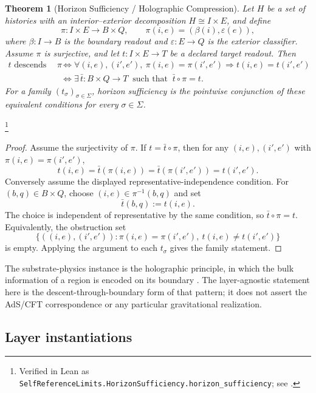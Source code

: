 \documentclass[11pt]{article}
\newtheorem{theorem}{Theorem}[section]
\theoremstyle{definition}
\begin{document}
\begin{theorem}[Horizon Sufficiency / Holographic Compression]\label{thm:F33}
Let \(H\) be a set of histories with an interior--exterior
decomposition \(H \cong I \times E\), and define
\[
  \pi : I \times E \longrightarrow B \times Q,
  \qquad
  \pi(i,e)=(\beta(i),\varepsilon(e)),
\]
where \(\beta:I\to B\) is the boundary readout and
\(\varepsilon:E\to Q\) is the exterior classifier. Assume \(\pi\) is
surjective, and let \(t:I\times E\to T\) be a declared target readout.
Then
\begin{align*}
  t \text{ descends through }\pi
  &\iff
  \forall (i,e),(i',e'),\
    \pi(i,e)=\pi(i',e')\Rightarrow t(i,e)=t(i',e')\\
  &\iff
  \exists\,\bar t:B\times Q\to T\ \text{ such that }\
    \bar t\circ\pi=t .
\end{align*}
For a family \((t_\sigma)_{\sigma\in\Sigma}\), horizon sufficiency is
the pointwise conjunction of these equivalent conditions for every
\(\sigma\in\Sigma\).
\end{theorem}
\footnote{\raggedright Verified in Lean as
\texttt{SelfReferenceLimits.\allowbreak{}HorizonSufficiency.\allowbreak{}horizon\_sufficiency};
see \Cref{app:formalization}.}
\begin{proof}
Assume the surjectivity of \(\pi\). If \(t=\bar t\circ\pi\), then for
any \((i,e),(i',e')\) with \(\pi(i,e)=\pi(i',e')\),
\[
  t(i,e)=\bar t(\pi(i,e))
        =\bar t(\pi(i',e'))
        =t(i',e').
\]
Conversely assume the displayed representative-independence condition.
For \((b,q)\in B\times Q\), choose \((i,e)\in\pi^{-1}(b,q)\) and set
\[
  \bar t(b,q):=t(i,e).
\]
The choice is independent of representative by the same condition, so
\(\bar t\circ\pi=t\). Equivalently, the obstruction set
\[
  \{((i,e),(i',e')):\pi(i,e)=\pi(i',e'),\ t(i,e)\ne t(i',e')\}
\]
is empty. Applying the argument to each \(t_\sigma\) gives the family
statement.
\end{proof}

The substrate-physics instance is the holographic principle, in which
the bulk information of a region is encoded on its boundary
\citep{Maldacena1997LargeN,Bousso2002Holographic}.  The
layer-agnostic statement here is the descent-through-boundary form
of that pattern; it does not assert the AdS/CFT correspondence or
any particular gravitational realization.

\subsection*{Layer instantiations}\label{layer-inst:F33}
\end{document}
